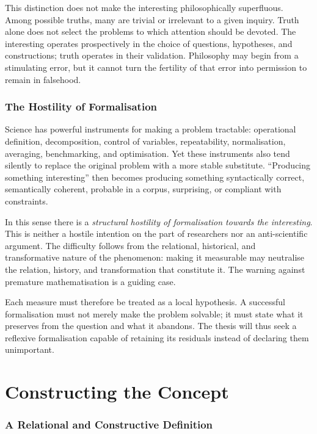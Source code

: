 \documentclass[11pt,a4paper]{article}
\begin{document}
This distinction does not make the interesting philosophically superfluous.
Among possible truths, many are trivial or irrelevant to a given inquiry. Truth
alone does not select the problems to which attention should be devoted. The
interesting operates prospectively in the choice of questions, hypotheses, and
constructions; truth operates in their validation. Philosophy may begin from a
stimulating error, but it cannot turn the fertility of that error into
permission to remain in falsehood.

\section{The Hostility of Formalisation}

Science has powerful instruments for making a problem tractable: operational
definition, decomposition, control of variables, repeatability, normalisation,
averaging, benchmarking, and optimisation. Yet these instruments also tend
silently to replace the original problem with a more stable substitute.
``Producing something interesting'' then becomes producing something
syntactically correct, semantically coherent, probable in a corpus, surprising,
or compliant with constraints.

In this sense there is a \emph{structural hostility of formalisation towards the
interesting}. This is neither a hostile intention on the part of researchers nor
an anti-scientific argument. The difficulty follows from the relational,
historical, and transformative nature of the phenomenon: making it measurable
may neutralise the relation, history, and transformation that constitute it.
The warning against premature mathematisation
\parencite{russell1995rationality,russell1995awardlecture} is a guiding case.

Each measure must therefore be treated as a local hypothesis. A successful
formalisation must not merely make the problem solvable; it must state what it
preserves from the question and what it abandons. The thesis will thus seek a
reflexive formalisation capable of retaining its residuals instead of declaring
them unimportant.

\part{Constructing the Concept}

\section{A Relational and Constructive Definition}
\end{document}
